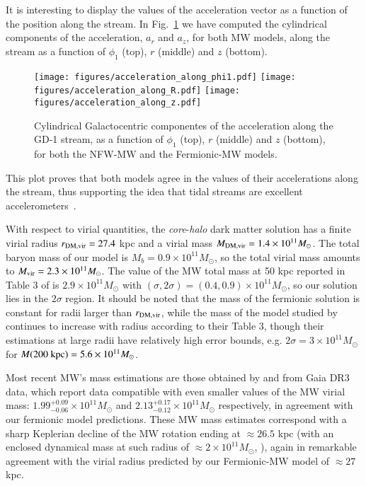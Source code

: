 \documentclass[twocolumn]{aa}
\begin{document}
It is interesting to display the values of the acceleration vector as a function of the position along the stream.
In Fig.~\ref{fig:acceleration} we have computed the cylindrical components of the acceleration, $a_r$ and $a_z$,
for both MW models, along the stream as a function of $\phi_1$ (top), $r$ (middle) and $z$ (bottom).
\begin{figure}
   \centering
   \texttt{[image: figures/acceleration\_along\_phi1.pdf]}
   \texttt{[image: figures/acceleration\_along\_R.pdf]}
   \texttt{[image: figures/acceleration\_along\_z.pdf]}
   \caption{Cylindrical Galactocentric componentes of the acceleration along the GD-1 stream,
   as a function of $\phi_1$ (top), $r$ (middle) and $z$ (bottom), for both the NFW-MW and the 
   Fermionic-MW models.}
   \label{fig:acceleration}
\end{figure}
This plot proves that both models agree in the values of their accelerations along the stream, thus supporting the idea that tidal streams are excellent accelerometers~\citep{Ibata_2016,2022ApJ...940...22N,2023ApJ...945L..32C}.

With respect to virial quantities, the \textit{core}-\textit{halo} dark matter solution has a finite virial radius $r_{\rm{DM,vir}}=27.4$ kpc and a virial mass
$M_{\rm{DM,vir}}=1.4\times10^{11} M_\odot$. The total baryon mass of our model is $M_b=0.9\times10^{11}M_\odot$, so the total virial mass amounts to
$M_{\rm{vir}}=2.3\times10^{11} M_\odot$. The value of the MW total mass at 50 kpc reported in Table 3
of \citet{2014MNRAS.445.3788G} is $2.9\times10^{11} M_\odot$ with $(\sigma, 2\sigma)=(0.4,0.9)\times10^{11} M_\odot$, so our solution lies in the $2\sigma$ region.
It should be noted that the mass of the fermionic solution is constant for radii larger than
$r_{\rm{DM,vir}}$, while the mass of the model studied by \citet{2014MNRAS.445.3788G} continues to increase with radius according to their Table 3, though their estimations at large radii have relatively
high error bounds, e.g. $2\sigma=3\times10^{11} M_\odot$ for $M(200 \hbox{ kpc}) =5.6\times10^{11} M_\odot$.

Most recent MW's mass estimations are those obtained by
\citet{Jiao2023} and \citet{Ou2023} from Gaia DR3 data, which report data compatible with even smaller values of the MW virial mass: $1.99^{+0.09}_{-0.06}\times10^{11} M_\odot$ and $2.13^{+0.17}_{-0.12}\times10^{11} M_\odot$ respectively, in agreement with our fermionic model predictions. These MW mass estimates correspond with a sharp Keplerian decline of the MW rotation ending at $\approx 26.5$ kpc (with an enclosed dynamical mass at such radius of $\approx 2\times 10^{11} M_\odot$, \citealp{Jiao2023}), again in remarkable agreement with the virial radius predicted by our Fermionic-MW model of $\approx 27$ kpc. 
\end{document}
